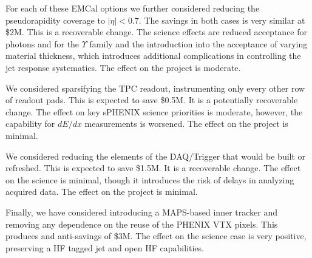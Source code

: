 For each of these EMCal options we further considered reducing the
pseudorapidity coverage to $|\eta| < 0.7$.  The savings in both cases
is very similar at \$2M.  This is a recoverable change.  The science
effects are reduced acceptance for photons and for the $\Upsilon$
family and the introduction into the acceptance of varying material
thickness, which introduces additional complications in controlling
the jet response systematics. The effect on the project is moderate.

We considered sparsifying the TPC readout, instrumenting only every
other row of readout pads.  This is expected to save \$0.5M.  It is a
potentially recoverable change. The effect on key sPHENIX science
priorities is moderate, however, the capability for $dE/dx$
measurements is worsened.  The effect on the project is minimal. 

We considered reducing the elements of the DAQ/Trigger that would be
built or refreshed.  This is expected to save \$1.5M.  It is a
recoverable change.  The effect on the science is minimal, though it
introduces the risk of delays in analyzing acquired data. The effect
on the project is minimal. 

Finally, we have considered introducing a MAPS-based inner tracker and
removing any dependence on the reuse of the PHENIX VTX pixels.  This
produces and anti-savings of \$3M.  The effect on the science case is
very positive, preserving a HF tagged jet and open HF capabilities. 





